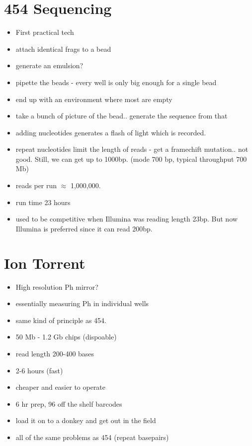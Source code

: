 \documentclass{article}
\begin{document}
    \section{454 Sequencing}
        \begin{itemize}
            \item First practical tech
            \item attach identical frags to a bead
            \item generate an emulsion?
            \item pipette the beads - every well is only big enough for a single bead
            \item end up with an environment where most are empty
            \item take a bunch of picture of the bead.. generate the sequence from that
            \item adding nucleotides generates a flash of light which is recorded.
            \item repeat nucleotides limit the length of reads - get a framechift mutation.. not good.  Still, we can get up to 1000bp. (mode 700 bp, typical throughput 700 Mb)
            \item reads per run $\approx$ 1,000,000.
            \item run time 23 hours
            \item used to be competitive when Illumina was reading length 23bp.  But now Illumina is preferred since it can read 200bp.
        \end{itemize}

    \section{Ion Torrent}
        \begin{itemize}
            \item High resolution Ph {\color{red} mirror?}
            \item essentially measuring Ph in individual wells
            \item same kind of principle as 454.
            \item 50 Mb - 1.2 Gb chips (dispoable)
            \item read length 200-400 bases
            \item 2-6 hours (fast)
            \item cheaper and easier to operate
            \item 6 hr prep, 96 off the shelf barcodes
            \item load it on to a donkey and get out in the field
            \item all of the same problems as 454 (repeat basepairs)
        \end{itemize}
\end{document}
